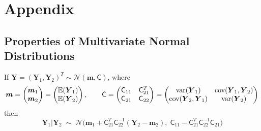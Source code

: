 \documentclass[smallextended]{svjour3}       %
\newcommand{\bm}[1]{\boldsymbol{#1}}
\newcommand{\Ex}{\mathbb{E}}
\newcommand{\vm}{\bm{m}}
\newcommand{\vY}{\bm{Y}}
\newcommand{\mC}{\mathsf{C}}
\newcommand{\cov}{{\textup{cov}}}
\newcommand{\var}{{\textup{var}}}
\newcommand{\calN}{\mathcal{N}}
\begin{document}
\section{Appendix}

\subsection{Properties of Multivariate Normal Distributions}


\begin{lemma} \label{thrm:condDist} If $\vY = (\vY_1, \vY_2)^T \sim \calN (\vm,\mC)$, where 
	\begin{equation*}
	\vm = \begin{pmatrix} \vm_1 \\ \vm_2 \end{pmatrix} = \begin{pmatrix} \Ex(\vY_1) \\ \Ex(\vY_2) \end{pmatrix}, \qquad 
	\mC = \begin{pmatrix}
	\mC_{11} & \mC_{21}^T \\ 	\mC_{21} & \mC_{22}
	\end{pmatrix} =
	 \begin{pmatrix}
	\var(\vY_{1}) & \cov(\vY_{1}, \vY_2) \\ 	\cov(\vY_2,\vY_{1}) & \var(\vY_{2})
	\end{pmatrix} 
	\end{equation*}
	then 
	\begin{equation*}
	\vY_1 \vert \vY_2 \; \sim \; \calN \bigl(\vm_1 + \mC_{21}^T \mC_{22}^{-1}(\vY_2 - \vm_2), \; \mC_{11} - \mC_{21}^T \mC_{22}^{-1} \mC_{21} \bigr)
	\end{equation*}
	
\end{lemma}
\end{document}
